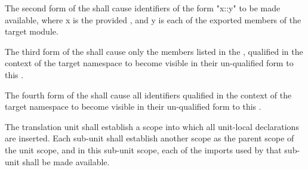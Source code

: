 \specsubitem
The second form of the  shall cause identifiers of
the form "x::y" to be made available, where x is the provided
, and y is each of the exported members of the target module.

\specsubitem
The third form of the  shall cause only the members
listed in the , qualified in the context of the target
namespace to become visible in their un-qualified form to this
.


\specsubitem
The fourth form of the  shall cause all identifiers
qualified in the context of the target namespace to become visible in their
un-qualified form to this .


\specsubitem
The translation unit shall establish a scope into which all
unit-local declarations are inserted. Each sub-unit shall establish another
scope as the parent scope of the unit scope, and in this sub-unit
scope, each of the imports used by that sub-unit shall be made available.


